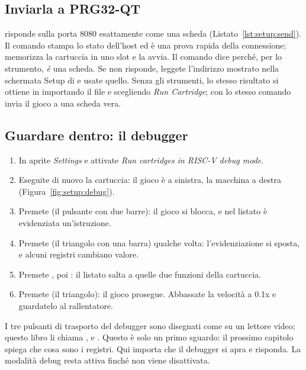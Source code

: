 \subsection{Inviarla a PRG32-QT}

\prgqt risponde sulla porta 8080 esattamente come una scheda
(Listato~\ref{lst:setup:send}). Il comando  stampa lo stato
dell'host ed è una prova rapida della connessione; 
memorizza la cartuccia in uno slot e la avvia. Il comando dice 
perché, per lo strumento, \prgqt \emph{è} una scheda. Se  non
risponde, leggete l'indirizzo mostrato nella schermata Setup di \prgqt e usate
quello. Senza gli strumenti, lo stesso risultato si ottiene in \prgqt
importando il file  e scegliendo \emph{Run Cartridge}; con
 lo stesso comando invia il gioco a una scheda
vera.


\subsection{Guardare dentro: il debugger}

\begin{prgtry}
\begin{enumerate}[nosep]
\item In \prgqt aprite \emph{Settings} e attivate \emph{Run cartridges in
  RISC-V debug mode}.
\item Eseguite di nuovo la cartuccia: il gioco è a sinistra, la macchina a
  destra (Figura~\ref{fig:setup:debug}).
\item Premete  (il pulsante con due barre): il gioco si blocca, e
  nel listato è evidenziata un'istruzione.
\item Premete  (il triangolo con una barra) qualche volta:
  l'evidenziazione si sposta, e alcuni registri cambiano valore.
\item Premete , poi : il listato salta a quelle due
  funzioni della cartuccia.
\item Premete  (il triangolo): il gioco prosegue. Abbassate la
  velocità a 0.1x e guardatelo al rallentatore.
\end{enumerate}
\end{prgtry}

I tre pulsanti di trasporto del debugger sono disegnati come su un lettore
video; questo libro li chiama ,  e .
Questo è solo un primo sguardo: il prossimo capitolo spiega che cosa sono i
registri. Qui importa che il debugger si apra e risponda. La modalità debug
resta attiva finché non viene disattivata.

